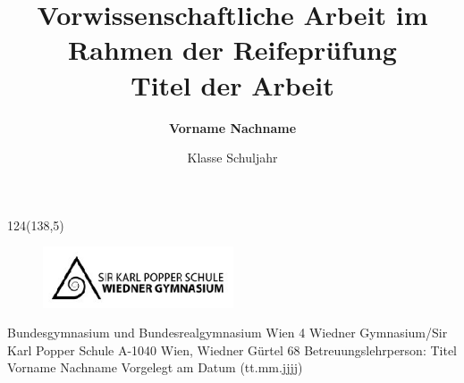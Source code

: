 \documentclass[a4paper,11pt]{article}
\author{\textbf{\Large{Vorname Nachname}}}
\title{\large{Vorwissenschaftliche Arbeit im Rahmen der Reifeprüfung}\\\vspace{50mm}\textbf{\LARGE{Titel der Arbeit}}}
\date{\large{Klasse \hspace*{10mm} Schuljahr}}
\begin{document}
\begin{titlingpage}
\singlespacing
\maketitle

\begin{textblock}{124}(138,5)
	\begin{figure}
	\includegraphics[width=160pt]{SKPLogo.eps}
	\end{figure}
\end{textblock}

\begin{center}
\vspace{96mm}
\large{
Bundesgymnasium und Bundesrealgymnasium Wien 4
\linebreak
Wiedner Gymnasium/Sir Karl Popper Schule
\linebreak
A-1040 Wien, Wiedner Gürtel 68
\vspace{10mm}
\linebreak
Betreuungslehrperson: Titel Vorname Nachname
\vspace{4mm}
\linebreak
Vorgelegt am Datum (tt.mm.jjjj)
}
\end{center}
\end{titlingpage}
\pagebreak
\end{document}
